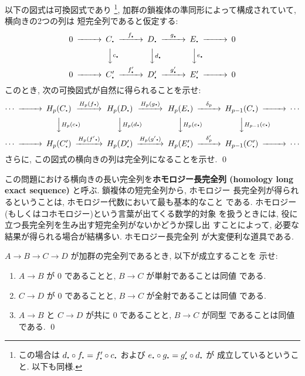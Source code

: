 \documentclass[12pt,twoside]{jarticle}
\begin{document}
\begin{question}[ホモロジー長完全列]\qstar{*}
  以下の図式は可換図式であり%
  \footnote{この場合は %
    $d_\bcdot \circ f_\bcdot = f'_\bcdot \circ c_\bcdot$ および %
    $e_\bcdot \circ g_\bcdot = g'_\bcdot \circ d_\bcdot$ が
    成立しているということ. 以下も同様.}, %
  加群の鎖複体の準同形によって構成されていて, 横向きの2つの列は
  短完全列であると仮定する: %
  \[
  \begin{CD}
    0 @>>>
    C_\bcdot @>f_{\raise0.05ex\hbox{\bf.}}>>
    D_\bcdot @>g_{\raise0.05ex\hbox{\bf.}}>>
    E_\bcdot @>>>
    0
    \\
    @.
    @VV{c_{\raise0.05ex\hbox{\bf.}}}V
    @VV{d_{\raise0.05ex\hbox{\bf.}}}V
    @VV{e_{\raise0.05ex\hbox{\bf.}}}V
    @.
    \\
    0 @>>>
    C'_\bcdot @>f'_{\raise0.05ex\hbox{\bf.}}>>
    D'_\bcdot @>g'_{\raise0.05ex\hbox{\bf.}}>>
    E'_\bcdot @>>>
    0
  \end{CD}
  \] %
  このとき, 次の可換図式が自然に得られることを示せ:
  \[
  \begin{CD}
    \cdots @>>>
    H_p(C_\bcdot) @>H_p(f{\raise0.05ex\hbox{\bf.}})>>
    H_p(D_\bcdot) @>H_p(g{\raise0.05ex\hbox{\bf.}})>>
    H_p(E_\bcdot) @>\delta_p>>
    H_{p-1}(C_\bcdot) @>>>
    \cdots
    \\
    @.
    @VV{H_p(c{\raise0.05ex\hbox{\bf.}})}V
    @VV{H_p(d{\raise0.05ex\hbox{\bf.}})}V
    @VV{H_p(e{\raise0.05ex\hbox{\bf.}})}V
    @VV{H_{p-1}(c{\raise0.05ex\hbox{\bf.}})}V
    @.
    \\
    \cdots @>>>
    H_p(C'_\bcdot) @>H_p(f'{\raise0.05ex\hbox{\bf.}})>>
    H_p(D'_\bcdot) @>H_p(g'{\raise0.05ex\hbox{\bf.}})>>
    H_p(E'_\bcdot) @>\delta'_p>>
    H_{p-1}(C'_\bcdot) @>>>
    \cdots
  \end{CD}
  \]
  さらに, この図式の横向きの列は完全列になることを示せ. \qed
\end{question}

\noindent この問題における横向きの長い完全列を{\bf ホモロジー長完全列
(homology long exact sequence)} と呼ぶ. 鎖複体の短完全列から, ホモロジー
長完全列が得られるということは, ホモロジー代数において最も基本的なこと
である. ホモロジー(もしくはコホモロジー)という言葉が出てくる数学的対象
を扱うときには, 役に立つ長完全列を生み出す短完全列がないかどうか探し出
すことによって, 必要な結果が得られる場合が結構多い. ホモロジー長完全列
が大変便利な道具である.

\begin{question}\qstar{*}
  $A \to B \to C \to D$ が加群の完全列であるとき, 以下が成立することを
  示せ:
  \begin{enumerate}
  \item $A\to B$ が $0$ であることと, $B\to C$ が単射であることは同値
    である.
  \item $C\to D$ が $0$ であることと, $B\to C$ が全射であることは同値
    である.
  \item $A\to B$ と $C\to D$ が共に $0$ であることと, $B\to C$ が同型
    であることは同値である. \qed
  \end{enumerate}
\end{question}
\end{document}
